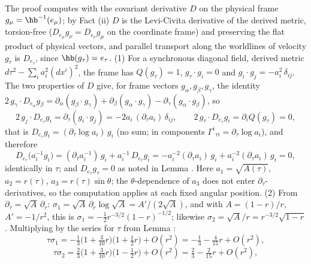 The proof computes with the covariant derivative $D$ on the physical frame $g_\mu = \hb^{-1}(e_\mu)$; by Fact (ii) $D$ is the Levi-Civita derivative of the derived metric, torsion-free ($D_{e_\mu} g_\nu = D_{e_\nu} g_\mu$ on the coordinate frame) and preserving the flat product of physical vectors, and parallel transport along the worldlines of velocity $g_\tau$ is $D_{e_\tau}$, since $\hb(g_\tau) = e_\tau$. (1) For a synchronous diagonal field, derived metric $d\tau^2 - \sum_i a_i^2 (dx^i)^2$, the frame has $Q(g_\tau) = 1$, $g_\tau \cdot g_i = 0$ and $g_i \cdot g_j = -a_i^2\,\delta_{ij}$. The two properties of $D$ give, for frame vectors $g_\alpha, g_\beta, g_\gamma$, the identity $2\,g_\gamma \cdot D_{e_\alpha} g_\beta = \partial_\alpha(g_\beta \cdot g_\gamma) + \partial_\beta(g_\alpha \cdot g_\gamma) - \partial_\gamma(g_\alpha \cdot g_\beta)$, so
\[
2\,g_j \cdot D_{e_\tau} g_i = \partial_\tau(g_i \cdot g_j) = -2a_i\,(\partial_\tau a_i)\,\delta_{ij}, \qquad
2\,g_\tau \cdot D_{e_\tau} g_i = \partial_i Q(g_\tau) = 0 ,
\]
that is $D_{e_\tau} g_i = (\partial_\tau \log a_i)\, g_i$ (no sum; in components $\Gamma^i{}_{\tau i} = \partial_\tau \log a_i$), and therefore
\[
D_{e_\tau}\bigl(a_i^{-1} g_i\bigr)
= (\partial_\tau a_i^{-1})\, g_i + a_i^{-1}\, D_{e_\tau} g_i
= -a_i^{-2}(\partial_\tau a_i)\, g_i + a_i^{-2}(\partial_\tau a_i)\, g_i = 0 ,
\]
identically in $\tau$; and $D_{e_\tau} g_\tau = 0$ as noted in Lemma . Here $a_1 = \sqrt{A(\tau)}$, $a_2 = r(\tau)$, $a_3 = r(\tau)\sin\theta$; the $\theta$-dependence of $a_3$ does not enter $\partial_\tau$-derivatives, so the computation applies at each fixed angular position. (2) From $\partial_\tau = \sqrt{A}\,\partial_r$: $\sigma_1 = \sqrt A\,\partial_r \log\sqrt A = A'/(2\sqrt A)$, and with $A = (1-r)/r$, $A' = -1/r^2$, this is $\sigma_1 = -\tfrac12 r^{-3/2}(1-r)^{-1/2}$; likewise $\sigma_2 = \sqrt A / r = r^{-3/2}\sqrt{1-r}$. Multiplying by the series for $\tau$ from Lemma :
\[
\tau\sigma_1 = -\tfrac13\bigl(1 + \tfrac{3}{10}r\bigr)\bigl(1 + \tfrac12 r\bigr) + O(r^2) = -\tfrac13 - \tfrac{4}{15}r + O(r^2),
\]
\[
\tau\sigma_2 = \tfrac23\bigl(1 + \tfrac{3}{10}r\bigr)\bigl(1 - \tfrac12 r\bigr) + O(r^2) = \tfrac23 - \tfrac{2}{15}r + O(r^2),
\]
